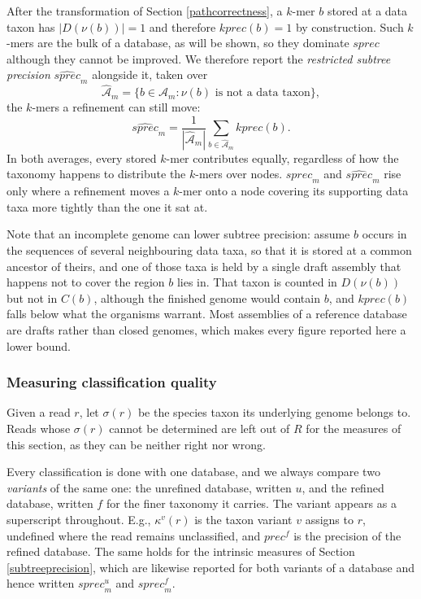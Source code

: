 \documentclass[pdflatex,sn-vancouver-num]{sn-jnl}
\begin{document}
    After the transformation of Section \ref{pathcorrectness}, a $k$-mer $b$ stored at a data taxon has $|D(\nu(b))| = 1$ and therefore $\mathit{kprec}(b) = 1$ by construction. Such $k$-mers are the bulk of a database, as will be shown, so they dominate $\mathit{sprec}$ although they cannot be improved. We therefore report the \emph{restricted subtree precision} $\widehat{\mathit{sprec}}_m$ alongside it, taken over
\[ \widehat{\mathcal{A}}_m = \{ b \in \mathcal{A}_m : \nu(b) \text{ is not a data taxon} \} , \]
    the $k$-mers a refinement can still move:
\[ \widehat{\mathit{sprec}}_m = \frac{1}{|\widehat{\mathcal{A}}_m|} \sum_{b \in \widehat{\mathcal{A}}_m} \mathit{kprec}(b) . \]
    In both averages, every stored $k$-mer contributes equally, regardless of how the taxonomy happens to distribute the $k$-mers over nodes. $\mathit{sprec}_m$ and $\widehat{\mathit{sprec}}_m$ rise only where a refinement moves a $k$-mer onto a node covering its supporting data taxa more tightly than the one it sat at.

    Note that an incomplete genome can lower subtree precision: assume $b$ occurs in the sequences of several neighbouring data taxa, so that it is stored at a common ancestor of theirs, and one of those taxa is held by a single draft assembly that happens not to cover the region $b$ lies in. That taxon is counted in $D(\nu(b))$ but not in $C(b)$, although the finished genome would contain $b$, and $\mathit{kprec}(b)$ falls below what the organisms warrant. Most assemblies of a reference database are drafts rather than closed genomes, which makes every figure reported here a lower bound.

    \subsubsection{Measuring classification quality}\label{classmeasures}

    Given a read $r$, let $\sigma(r)$ be the species taxon its underlying genome belongs to. Reads whose $\sigma(r)$ cannot be determined are left out of $R$ for the measures of this section, as they can be neither right nor wrong.

    Every classification is done with one database, and we always compare two \emph{variants} of the same one: the unrefined database, written $u$, and the refined database, written $f$ for the finer taxonomy it carries. The variant appears as a superscript throughout. E.g., $\kappa^v(r)$ is the taxon variant $v$ assigns to $r$, undefined where the read remains unclassified, and $\mathit{prec}^f$ is the precision of the refined database. The same holds for the intrinsic measures of Section \ref{subtreeprecision}, which are likewise reported for both variants of a database and hence written $\mathit{sprec}^u_m$ and $\mathit{sprec}^f_m$.
\end{document}

